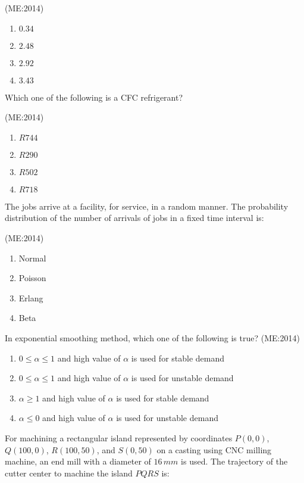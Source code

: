 	    \hfill{(ME:2014)}
    \begin{multicols}{4}
    \begin{enumerate}
        \item $0.34$
        \item $2.48$
        \item $2.92$
        \item $3.43$
    \end{enumerate}
    \end{multicols}

    \item Which one of the following is a CFC refrigerant?
	   
	    \hfill{(ME:2014)}
    \begin{multicols}{4}
    \begin{enumerate}
        \item $R744$
        \item $R290$
        \item $R502$
        \item $R718$
    \end{enumerate}
    \end{multicols}
\vspace{0.5cm}
    \item The jobs arrive at a facility, for service, in a random manner. The probability distribution of the number of arrivals of jobs in a fixed time interval is: 

	    \hfill{(ME:2014)}
		\begin{multicols}{4}
    \begin{enumerate}
        \item Normal
        \item Poisson
        \item Erlang
        \item Beta
    \end{enumerate}
    \end{multicols}
\vspace{0.5cm}
    \item In exponential smoothing method, which one of the following is true? 
	    \hfill{(ME:2014)}
    \begin{enumerate}
        \item $0 \leq \alpha \leq 1$ and high value of $\alpha$ is used for stable demand
        \item $0 \leq \alpha \leq 1$ and high value of $\alpha$ is used for unstable demand
        \item $\alpha \geq 1$ and high value of $\alpha$ is used for stable demand
        \item $\alpha \leq 0$ and high value of $\alpha$ is used for unstable demand
    \end{enumerate}
\vspace{0.5cm}
    \item For machining a rectangular island represented by coordinates $P(0,0)$, $Q(100,0)$, $R(100,50)$, and $S(0,50)$ on a casting using CNC milling machine, an end mill with a diameter of $16 \, mm$ is used. The trajectory of the cutter center to machine the island $PQRS$ is:

